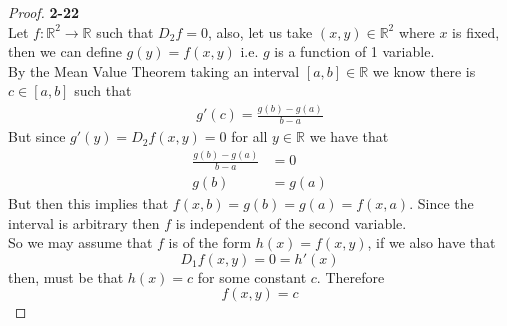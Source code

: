 \documentclass[11pt]{article}
\newcommand{\R}{\mathbb{R}}
\theoremstyle{definition}
\begin{document}
\cleardoublepage
\begin{proof}{\textbf{2-22}}\\
Let $f:\R^2 \to \R$ such that $D_2f = 0$, also, let us take $(x, y)\in \R^2$
where $x$ is fixed, then we can define $g(y) = f(x,y)$ i.e. $g$ is a function
of 1 variable.
\\
By the Mean Value Theorem taking an interval $[a,b]\in\R$ we know there is
$c \in [a,b]$ such that
\begin{align*}
    g'(c) = \frac{g(b) - g(a)}{b - a}
\end{align*}
But since $g'(y) = D_2f(x,y) = 0$ for all $y \in \R$ we have that
\begin{align*}
    \frac{g(b) - g(a)}{b - a} &= 0\\
    g(b) &= g(a)
\end{align*}
But then this implies that $f(x,b) = g(b) = g(a) = f(x,a)$. Since the interval
is arbitrary then $f$ is independent of the second variable.
\\
So we may assume that $f$ is of the form $h(x) = f(x,y)$, if we also have that
$$D_1f(x,y) = 0 = h'(x)$$
then, must be that $h(x) = c$ for some constant $c$. Therefore
$$f(x,y) = c$$

\end{proof}
\end{document}
